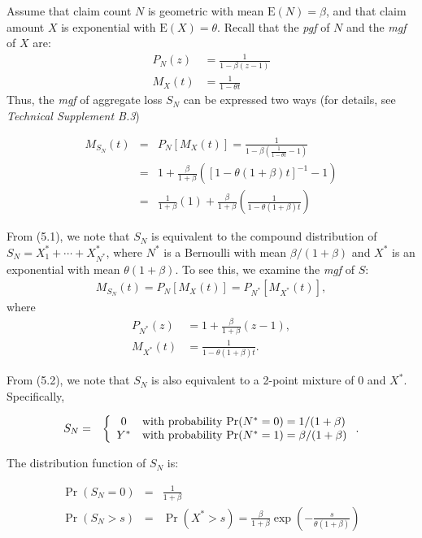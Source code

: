 \documentclass[]{book}
\theoremstyle{definition}
\theoremstyle{definition}
\theoremstyle{definition}
\theoremstyle{remark}
\begin{document}
Assume that claim count \(N\) is geometric with mean
\(\mathrm{E}(N)=\beta\), and that claim amount \(X\) is exponential with
\(\mathrm{E}(X)=\theta\). Recall that the \emph{pgf} of \(N\) and the
\emph{mgf} of \(X\) are: \[\begin{aligned}
P_N (z) &=\frac{1}{1- \beta (z-1)}\\
M_{X}(t) &=\frac{1}{1-\theta t}
\end{aligned}\] Thus, the \emph{mgf} of aggregate loss \(S_N\) can be
expressed two ways (for details, see \emph{Technical Supplement B.3})

\begin{eqnarray}
M_{S_N}(t) &=& P_N [M_{X}(t)] = \frac{1}{1 - \beta \left( \frac{1}{1-\theta t} - 1\right)} \nonumber\\
&=& 1+ \frac{\beta}{1+\beta} \left([1-\theta(1+\beta)t]^{-1}-1 \right)\\
&=& \frac{1}{1+\beta}(1) +\frac{\beta}{1+\beta}
\left( \frac{1}{1-\theta (1+\beta)t}\right)
\end{eqnarray}

From (5.1), we note that \(S_N\) is equivalent to the compound
distribution of \(S_N=X^{*}_1+\cdots+X^{*}_{N^{*}}\), where \(N^{*}\) is
a Bernoulli with mean \(\beta/(1+\beta)\) and \(X^{*}\) is an
exponential with mean \(\theta(1+\beta)\). To see this, we examine the
\emph{mgf} of \(S\): \[\begin{aligned}
M_{S_N}(t) = P_N [M_{X}(t)] = P_{N^{*}} [M_{X^{*}}(t)],
\end{aligned}\] where \[\begin{aligned}
P_{N^*} (z) &=1+ \frac{\beta}{1+ \beta} (z-1),\\
M_{X^*} (t) &=\frac{1}{1- {{\theta(1+\beta)}} t}.
\end{aligned}\]

From (5.2), we note that \(S_N\) is also equivalent to a 2-point mixture
of 0 and \(X^{*}\). Specifically,

\begin{eqnarray*}
S_N &=&
\left\{
\begin{array}{cl}
0 & {\rm with~ probability ~Pr}(N^*=0) = 1/(1+\beta) \\
Y^{*} & {\rm with~ probability ~Pr}(N^*=1) = \beta/(1+\beta)
\end{array}
\right..
\end{eqnarray*}

The distribution function of \(S_N\) is:

\begin{eqnarray*}
\Pr(S_N=0) &=& \frac{1}{1+\beta}\\
\Pr(S_N>s) &=& \Pr(X^*>s) =\frac{\beta}{1+\beta} \exp\left( -\frac{s}{
\theta (1+\beta)}\right)
\end{eqnarray*}
\end{document}
